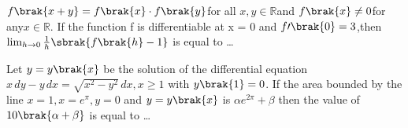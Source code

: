 $
f\brak{x + y} = f\brak{x} \cdot f\brak{y}$for all $x, y \in \mathbb{R} $and $ f\brak{x} \neq 0 $for any$ x \in \mathbb{R}
$. If the function f is differentiable at x = 0 and $f\prime\brak{0}=3$,then $
\lim_{h \to 0} \frac{1}{h}  \sbrak{f\brak{h} - 1 }$ is equal to \dots
\hfill{}
\item Let $y = y \brak{x}$ be the solution of the differential equation $x \, dy - y \, dx = \sqrt{x^2 - y^2} \, dx, x \geq 1
$ with $y\brak{1}=0$. If the area bounded by the line $x = 1, x = e^\pi, y = 0$ and $y = y\brak{x}$ is $ \alpha e^{2\pi} + \beta $ then the value of $10 \brak{\alpha + \beta}$ is equal to \dots
\hfill{}

